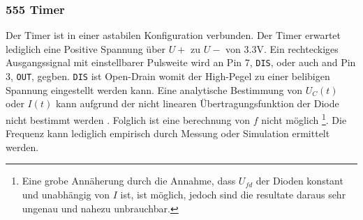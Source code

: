 \subsubsection{555 Timer}

Der Timer ist in einer astabilen Konfiguration verbunden.
Der Timer erwartet lediglich eine Positive Spannung über $U+$ zu $U-$ von $3.3\si{\volt}$.
Ein rechteckiges Ausgangssignal mit einstellbarer Pulsweite wird an Pin 7, \texttt{DIS}, oder auch and Pin 3, \texttt{OUT}, gegben.
\texttt{DIS} ist Open-Drain womit der High-Pegel zu einer belibigen Spannung eingestellt werden kann.
Eine analytische Bestimmung von $U_C(t)$ oder $I(t)$ kann aufgrund der nicht linearen Übertragungsfunktion der Diode nicht bestimmt werden \autocite{rdc}.
Folglich ist eine berechnung von $f$ nicht möglich
\footnote{Eine grobe Annäherung durch die Annahme, dass $U_{fd}$ der Dioden konstant und unabhängig von $I$ ist, ist möglich, jedoch sind die resultate daraus sehr ungenau und nahezu unbrauchbar.}.
Die Frequenz kann lediglich empirisch durch Messung oder Simulation ermittelt werden.

